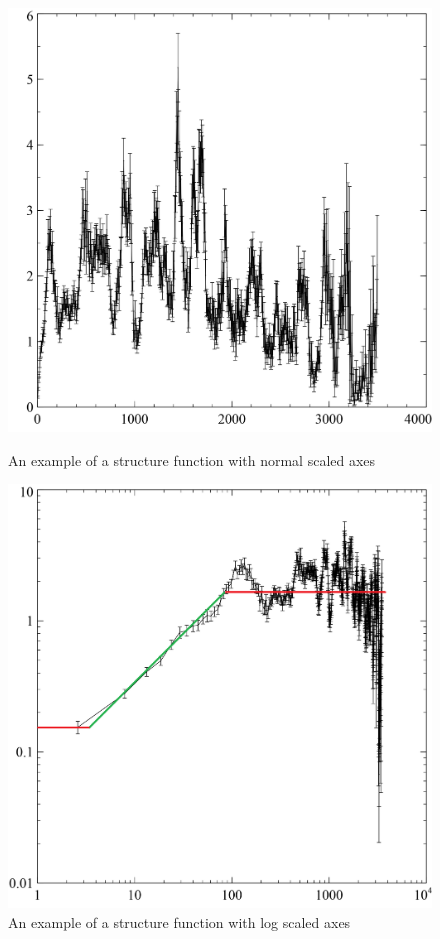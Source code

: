 \documentclass[12pt, oneside]{smuthesis}
\begin{document}
\begin{figure}
	\centering
	\begin{minipage}{0.45\textwidth}
		\centering
		\includegraphics[width=0.8\linewidth]{structureFunctionShape}
		\caption{An example of a structure function with normal scaled axes \citep{galloblue}}
		\label{fig:structureFunctionShape}
	\end{minipage}
	\begin{minipage}{0.1\textwidth}
	\end{minipage}
	\begin{minipage}{0.45\textwidth}
		\centering
		\includegraphics[width=0.8\linewidth]{structureFunctionLogShape}
		\caption{An example of a structure function with log scaled axes \citep{galloblue}}
		\label{fig:structureFunctionLogShape}
	\end{minipage}
\end{figure}
\end{document}
